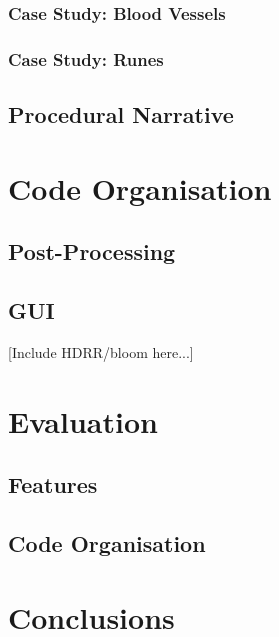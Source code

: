 \documentclass[a4paper, 11pt]{article}
\begin{document}
\begin{flushleft}
\vspace{5pt}\noindent

\subsubsection{Case Study: Blood Vessels} %

\subsubsection{Case Study: Runes}

\subsection{Procedural Narrative} %

\section{Code Organisation}


\subsection{Post-Processing}

\subsection{GUI}

[Include HDRR/bloom here...]

\section{Evaluation}\label{Evaluation}

\subsection{Features}

\subsection{Code Organisation}

\section{Conclusions}



\end{flushleft}
\end{document}
